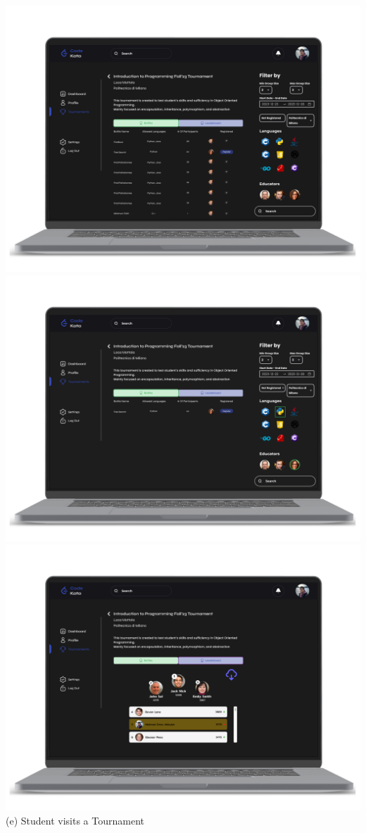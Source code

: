 \begin{center}
    \includegraphics[scale=0.13]{Images/ui-ux/student_tournament/student_tournament_1.png}
    \includegraphics[scale=0.13]{Images/ui-ux/student_tournament/student_tournament_2.png}    \includegraphics[scale=0.13]{Images/ui-ux/student_tournament/student_tournament_3.png} 
    \\ (e) Student visits a Tournament
\end{center}
